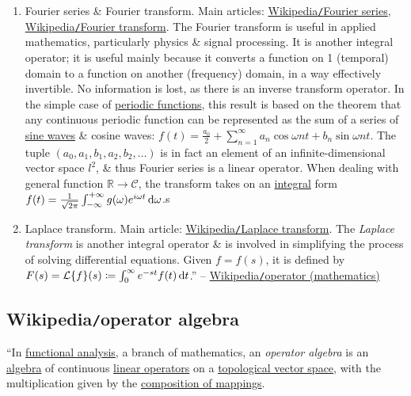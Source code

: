 \documentclass{article}
\begin{document}
\begin{enumerate}
	\item {\sf Fourier series \& Fourier transform.} Main articles: \href{https://en.wikipedia.org/wiki/Fourier_series}{Wikipedia{\tt/}Fourier series}, \href{https://en.wikipedia.org/wiki/Fourier_transform}{Wikipedia{\tt/}Fourier transform}. The Fourier transform is useful in applied mathematics, particularly physics \& signal processing. It is another integral operator; it is useful mainly because it converts a function on 1 (temporal) domain to a function on another (frequency) domain, in a way effectively invertible. No information is lost, as there is an inverse transform operator. In the simple case of \href{https://en.wikipedia.org/wiki/Periodic_function}{periodic functions}, this result is based on the theorem that any continuous periodic function can be represented as the sum of a series of \href{https://en.wikipedia.org/wiki/Sine_wave}{sine waves} \& cosine waves: $f(t) = \frac{a_0}{2} + \sum_{n=1}^\infty a_n\cos\omega nt + b_n\sin\omega nt$. The tuple $(a_0,a_1,b_1,a_2,b_2,\ldots)$ is in fact an element of an infinite-dimensional vector space \href{https://en.wikipedia.org/wiki/Sequence_space}{$l^2$}, \& thus Fourier series is a linear operator. When dealing with general function $\mathbb{R}\to\mathcal{C}$, the transform takes on an \href{https://en.wikipedia.org/wiki/Integral}{integral} form $f(t) = \frac{1}{\sqrt{2\pi}}\int_{-\infty}^{+\infty} g(\omega)e^{i\omega t}\,{\rm d}\omega$.s
	\item {\sf Laplace transform.} Main article: \href{https://en.wikipedia.org/wiki/Laplace_transform}{Wikipedia{\tt/}Laplace transform}. The {\it Laplace transform} is another integral operator \& is involved in simplifying the process of solving differential equations. Given $f = f(s)$, it is defined by $F(s) = \mathcal{L}\{f\}(s)\coloneqq\int_0^\infty e^{-st}f(t)\,{\rm d}t$.'' -- \href{https://en.wikipedia.org/wiki/Operator_(mathematics)}{Wikipedia{\tt/}operator (mathematics)}
\end{enumerate}


\subsection{Wikipedia{\tt/}operator algebra}
``In \href{https://en.wikipedia.org/wiki/Functional_analysis}{functional analysis}, a branch of mathematics, an {\it operator algebra} is an \href{https://en.wikipedia.org/wiki/Algebra_over_a_field}{algebra} of continuous \href{https://en.wikipedia.org/wiki/Linear_operator}{linear operators} on a \href{https://en.wikipedia.org/wiki/Topological_vector_space}{topological vector space}, with the multiplication given by the \href{https://en.wikipedia.org/wiki/Function_composition}{composition of mappings}.
\end{document}
